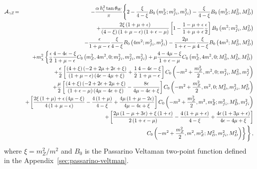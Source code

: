 \begin{eqnarray}
\label{eq:form-factor-SSGZ}
\mathcal{A}_{\gamma Z}\!\!&\,=\,&\!\!
-\dfrac{\alpha\, h_{i}^2 \tan\theta_W}{\pi} \Bigg{\{ } 
2-\frac{\xi}{4-\xi}B_0\left(m_Z^2;m_{fi}^2,m_{fi}^2\right)
-\frac{\xi}{4-\xi}B_0\left(m_Z^2;M_D^2,M_D^2\right)\nonumber\\
&&
+\frac{2\xi\left(1+\mu+\epsilon\right)}
{\left(4-\xi\right)\left(1+\mu-\epsilon\right)\left(1+\epsilon-\mu\right)}
\left[1-\frac{1-\mu+\epsilon}{1+\mu+\epsilon}\frac{\epsilon}{2}\right]
B_0\left(m^2;m_{fi}^2,M_D^2\right)\nonumber\\
&&
-\frac{\epsilon}{1+\mu-\epsilon}\frac{\xi}{4-\xi}
B_0\left(4m^2;m_{fi}^2,m_{fi}^2\right)
-\frac{2\mu}{1+\epsilon-\mu}\frac{\xi}{4-\xi}
B_0\left(4m^2;M_D^2,M_D^2\right)\nonumber\\
&&
+m_\chi^2\left\{
\frac{\epsilon}{2}\frac{4-4\epsilon-\xi}{1+\mu-\epsilon}
C_0\left(m_Z^2,4m^2,0;m_{fi}^2,m_{fi}^2,m_{fi}^2\right)
+\mu\frac{4-4\mu-\xi}{1+\epsilon-\mu}
C_0\left(m_Z^2,4m^2,0;M_D^2,M_D^2,M_D^2\right)\right.\nonumber\\
&&
+\frac{\epsilon}{2}\left[\frac{\left(4+\xi\right)\left(-2+2\mu+2\epsilon+\xi\right)}
{\left(1+\mu-\epsilon\right)\left(4\epsilon-4\mu+\xi\right)}
+\frac{1}{2}\frac{4-4\epsilon-\xi}{1+\mu-\epsilon}
\right]
C_0\left(-m^2+\frac{m_Z^2}{2},m^2,0;m_{fi}^2,M_D^2,m_f^2\right)\nonumber\\
&&
+\frac{\mu}{2}\left[\frac{\left(4+\xi\right)\left(-2+2\epsilon+2\mu+\xi\right)}
{\left(1+\epsilon-\mu\right)\left(4\mu-4\epsilon+\xi\right)}
-\frac{8\epsilon}{4\mu-4\epsilon+\xi}
\right]
C_0\left(-m^2+\frac{m_Z^2}{2},m^2,0;M_D^2,m_{fi}^2,M_D^2\right)\nonumber\\
&&
+\left[
\frac{2\xi\left(1+\mu\right)+\epsilon\left(4\mu-\xi\right)}{4\left(1+\mu-\epsilon\right)}
-\frac{4\left(1+\mu\right)}{4-\xi}+\frac{4\mu\left(1+\mu-2\epsilon\right)}{4\mu-4\epsilon+\xi}
\right]C_0\left(-m^2+\frac{m_Z^2}{2},m^2,m_Z^2;m_{fi}^2,M_D^2,m_{fi}^2\right)\nonumber\\
&&
+\left[
\frac{2\mu\left(1-\mu+3\epsilon\right)+\xi\left(1+\epsilon\right)}
{2\left(1+\epsilon-\mu\right)}
-\frac{4\left(1+\mu+\epsilon\right)}{4-\xi}
+\frac{4\epsilon\left(1+3\mu+\epsilon\right)}{4\epsilon-4\mu+\xi} \right]\nonumber \\
&&
\left. C_0\left(-m^2+\frac{m_Z^2}{2},m^2,m_Z^2;M_D^2,m_{fi}^2,M_D^2\right)
\right\} \Bigg{\} } \,,
\end{eqnarray}
where $\xi=m_Z^2/m^2$ and $B_0$ is the Passarino Veltaman two-point function defined in the Appendix~\ref{sec:passarino-veltman}.



